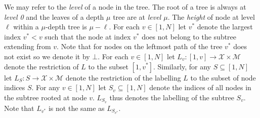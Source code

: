 We may refer to the \emph{level} of a node in the tree. The root of a tree is always at \emph{level 0} and the leaves of a depth $\mu$ tree are at \emph{level $\mu$}. The \emph{height} of node at level $\ell$ within a $\mu$-depth tree is $\mu - \ell$. For each $v \in [1,N]$ let $v^*$ denote the largest index $v^* < v$ such that the node at index $v^*$ does not belong to the subtree extending from $v$. Note that for nodes on the leftmost path of the tree $v^*$ does not exist so we denote it by $\bot$. For each $v \in [1,N]$ let $L_v:[1,v] \rightarrow \mathcal{X} \times \mathcal{M}$ denote the restriction of $L$ to the subset $[1,v^*]$. 
Similarly, for any $S \subseteq [1,N]$ let $L_S: S \rightarrow \mathcal{X} \times \mathcal{M}$ denote the restriction of the labelling $L$ to the subset of node indices $S$. For any $v \in [1, N]$ let $S_v \subseteq [1,N]$ denote the indices of all nodes in the subtree rooted at node $v$. $L_{S_v}$ thus denotes the labelling of the subtree $S_v$. Note that $L_{v^*}$ is not the same as $L_{S_{v^*}}$. 
